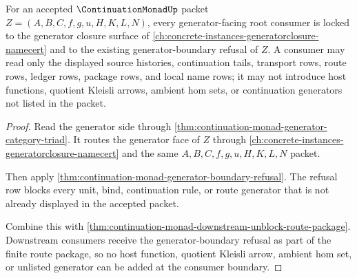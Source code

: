 \begin{theorem}
\label{thm:continuation-monad-root-generator-consumer-lock}
For an accepted $\ContinuationMonadUp$ packet $Z=(A,B,C,f,g,u,H,K,L,N)$, every generator-facing root consumer is locked to the generator closure surface of \autoref{ch:concrete-instances-generatorclosure-namecert} and to the existing generator-boundary refusal of $Z$. A consumer may read only the displayed source histories, continuation tails, transport rows, route rows, ledger rows, package rows, and local name rows; it may not introduce host functions, quotient Kleisli arrows, ambient hom sets, or continuation generators not listed in the packet.
\end{theorem}
\begin{proof}
Read the generator side through \autoref{thm:continuation-monad-generator-category-triad}. It routes the generator face of $Z$ through \autoref{ch:concrete-instances-generatorclosure-namecert} and the same $A,B,C,f,g,u,H,K,L,N$ packet.

Then apply \autoref{thm:continuation-monad-generator-boundary-refusal}. The refusal row blocks every unit, bind, continuation rule, or route generator that is not already displayed in the accepted packet.

Combine this with \autoref{thm:continuation-monad-downstream-unblock-route-package}. Downstream consumers receive the generator-boundary refusal as part of the finite route package, so no host function, quotient Kleisli arrow, ambient hom set, or unlisted generator can be added at the consumer boundary.
\end{proof}

